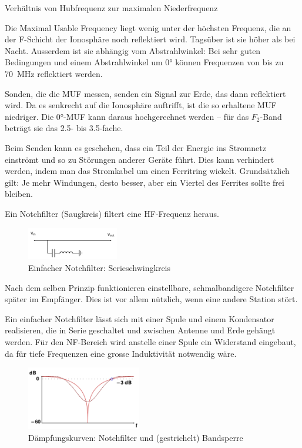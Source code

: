{Verhältnis von Hubfrequenz zur maximalen Niederfrequenz}

{Die Maximal Usable Frequency liegt wenig unter der höchsten Frequenz, die an der F-Schicht der Ionosphäre noch reflektiert wird. Tagsüber ist sie höher als bei Nacht. Ausserdem ist sie abhängig vom Abstrahlwinkel: Bei sehr guten Bedingungen und einem Abstrahlwinkel um 0° können Frequenzen von bis zu 70 MHz reflektiert werden.

Sonden, die die MUF messen, senden ein Signal zur Erde, das dann reflektiert wird. Da es senkrecht auf die Ionosphäre auftrifft, ist die so erhaltene MUF niedriger. Die 0°-MUF kann daraus hochgerechnet werden – für das $F_2$-Band beträgt sie das 2.5- bis 3.5-fache.}

{Beim Senden kann es geschehen, dass ein Teil der Energie ins Stromnetz einströmt und so zu Störungen anderer Geräte führt. Dies kann verhindert werden, indem man das Stromkabel um einen Ferritring wickelt. Grundsätzlich gilt: Je mehr Windungen, desto besser, aber ein Viertel des Ferrites sollte frei bleiben.}

{}

{Ein Notchfilter (Saugkreis) filtert eine HF-Frequenz heraus.

\begin{figure}[h!]
 \centering
 \includegraphics[width=4cm]{./png/Amfu-Schema-Notchfilter.png}
 \caption{Einfacher Notchfilter: Serieschwingkreis}
 \label{fig:notchfilter}
\end{figure}

Nach dem selben Prinzip funktionieren einstellbare, schmalbandigere Notchfilter später im Empfänger. Dies ist vor allem nützlich, wenn eine andere Station stört.

Ein einfacher Notchfilter lässt sich mit einer Spule und einem Kondensator realisieren, die in Serie geschaltet und zwischen Antenne und Erde gehängt werden. Für den NF-Bereich wird anstelle einer Spule ein Widerstand eingebaut, da für tiefe Frequenzen eine grosse Induktivität notwendig wäre.

\begin{figure}[h!]
 \centering
 \includegraphics[width=5cm]{./png/Amfu-Notchfilter.png}
 \caption{Dämpfungskurven: Notchfilter und 
(gestrichelt) Bandsperre}
 \label{fig:notchfilterFreq}
\end{figure}
}

